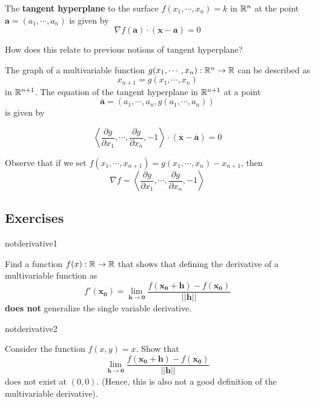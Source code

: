 \begin{corollary}
    The \textbf{tangent hyperplane} to the surface $f(x_1,\cdots,x_n) = k$ in $\mathbb{R}^n$ at the point $\bm{a} = (a_1,\cdots, a_n)$ is given by 
    $$\nabla f(\bm{a}) \cdot (\bm{x - a}) = 0$$
    \end{corollary}

\begin{motivating}
    How does this relate to previous notions of tangent hyperplane?
\end{motivating}
        
    \begin{theorem}
    The graph of a multivariable function $g(x_1, \cdots, x_n) : \mathbb{R}^n \to \mathbb{R}$ can be described as $$x_{n+1} = g(x_1, \cdots, x_n)$$ in $\mathbb{R}^{n+1}$.  The equation of the tangent hyperplane in $\mathbb{R}^{n+1}$ at a point $$\bm{\overline{a}} = (a_1, \cdots, a_n, g(a_1, \cdots, a_n))$$ is given by 
    
    
    $$\left\langle \frac{\partial g}{\partial x_1}, \cdots, \frac{\partial g}{\partial x_n}, -1 \right\rangle \cdot (\bm{\overline{x}} - \bm{\overline{a}}) = 0$$
    \end{theorem}

    Observe that if we set $f(x_1, \cdots, x_{n+1}) = g(x_1, \cdots, x_n) - x_{n+1}$, then $$\nabla f = \left\langle \frac{\partial g}{\partial x_1}, \cdots, \frac{\partial g}{\partial x_n}, -1 \right\rangle$$

\subsection{Exercises}



\begin{problem}{notderivative1}


    Find a function $f(x) : \mathbb{R} \to \mathbb{R}$ that shows that defining the derivative of a multivariable function as 
    $$f'(\bm{x_0}) = \lim_{\bm{h} \to \bm{0}} \frac{f(\bm{x_0+h})-f(\bm{x_0})}{||\bm{h}||}$$ \textbf{does not} generalize the single variable derivative.


    
\end{problem}

\begin{problem}{notderivative2}

    Consider the function $f(x,y) = x$.  Show that  $$\lim_{\bm{h} \to \bm{0}} \frac{f(\bm{x_0+h})-f(\bm{x_0})}{||\bm{h}||}$$ does not exist at $(0,0)$.  (Hence, this is also not a good definition of the multivariable derivative).
    
\end{problem}


